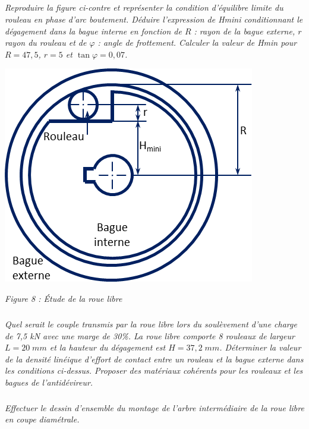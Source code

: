 \documentclass[10pt,fleqn]{article} %
\begin{document}
\begin{minipage}[c]{.6\linewidth}
\subparagraph{}
\textit{Reproduire la figure ci-contre et représenter la condition d'équilibre limite du rouleau en phase d'arc boutement. Déduire l'expression de Hmini conditionnant le dégagement dans la bague interne en fonction de $R$ : rayon de la bague externe, $r$ rayon du rouleau et de $\varphi$ : angle de frottement.
Calculer la valeur de Hmin pour $R=47,5$, $r=5$ et $\tan\varphi = 0,07$.}

\end{minipage} \hfill
\begin{minipage}[c]{.38\linewidth}
\begin{center}
\includegraphics[width=.95\textwidth]{images/rouelibre}

\textit{Figure 8 : Étude de la roue libre}
\end{center}
\end{minipage} 


\subparagraph{}
\textit{Quel serait le couple transmis par la roue libre lors du soulèvement d'une charge de 7,5 kN avec une marge de 30\%.
La roue libre comporte 8 rouleaux de largeur $L=20\;mm$ et la hauteur du dégagement est $H=37,2\; mm$. Déterminer la valeur de la densité linéique d'effort de contact entre un rouleau et la bague externe dans les conditions ci-dessus.
Proposer des matériaux cohérents pour les rouleaux et les bagues de l'antidévireur.}


\subparagraph{}
\textit{Effectuer le dessin d'ensemble du montage de l'arbre intermédiaire de la roue libre en coupe diamétrale.}
\end{document}
